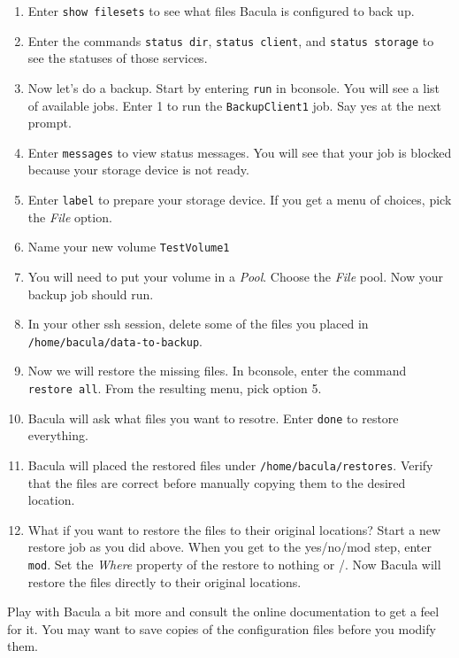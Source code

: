 \documentclass{article}   	%
\begin{document}
\begin{enumerate}
  \item Enter \texttt{show filesets} to see what files Bacula is configured to back up.

  \item Enter the commands \texttt{status dir}, \texttt{status client}, and \texttt{status storage} to see the statuses of those services.

  \item Now let's do a backup.  Start by entering \texttt{run} in bconsole.  You will see a list of available jobs.  Enter 1 to run the 
        \texttt{BackupClient1} job.  Say yes at the next prompt.

  \item Enter \texttt{messages} to view status messages.  You will see that your job is blocked because your storage device is not ready.

  \item Enter \texttt{label} to prepare your storage device. If you get a menu of choices, pick the \emph{File} option.

  \item Name your new volume \texttt{TestVolume1}

  \item You will need to put your volume in a \emph{Pool}.  Choose the \emph{File} pool.  Now your backup job should run.

  \item In your other ssh session, delete some of the files you placed in \texttt{/home/bacula/data-to-backup}.

  \item Now we will restore the missing files.  In bconsole, enter the command \texttt{restore all}.  From the 
        resulting menu, pick option 5.

  \item Bacula will ask what files you want to resotre.  Enter \texttt{done} to restore everything.

  \item Bacula will placed the restored files under \texttt{/home/bacula/restores}.  Verify that the files are correct
        before manually copying them to the desired location.

  \item What if you want to restore the files to their original locations?  Start a new restore job as you did above.
        When you get to the yes/no/mod step, enter \texttt{mod}. Set the \emph{Where} property of the restore to 
	nothing or /.  Now Bacula will restore the files directly to their original locations. 

\end{enumerate}

Play with Bacula a bit more and consult the online documentation to get a feel for it.  You may want to save copies of the configuration files 
before you modify them.
\end{document}
